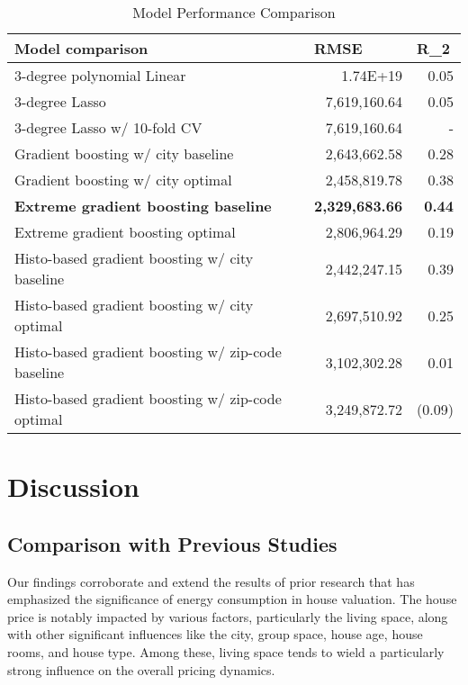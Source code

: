 \documentclass[12pt]{article} %
\begin{document}
{            \begin{table}[h]
                \begin{tabular}{lrr}
                \textbf{Model   comparison} & \multicolumn{1}{l}{\textbf{RMSE}} & \multicolumn{1}{l}{\textbf{R\_2}} \\ \hline
                3-degree polynomial Linear                           & 1.74E+19     & 0.05   \\
                3-degree Lasso                                       & 7,619,160.64 & 0.05   \\
                3-degree Lasso w/ 10-fold CV                         & 7,619,160.64 & -      \\
                Gradient boosting w/ city baseline                   & 2,643,662.58 & 0.28   \\
                Gradient boosting w/ city optimal                    & 2,458,819.78 & 0.38   \\
                \textbf{Extreme gradient boosting baseline}                   & \textbf{2,329,683.66} & \textbf{0.44}   \\
                Extreme gradient boosting optimal                    & 2,806,964.29 & 0.19   \\
                Histo-based gradient boosting w/ city   baseline     & 2,442,247.15 & 0.39   \\
                Histo-based gradient boosting w/ city   optimal      & 2,697,510.92 & 0.25   \\
                Histo-based gradient boosting w/ zip-code   baseline & 3,102,302.28 & 0.01   \\
                Histo-based gradient boosting   w/ zip-code optimal  & 3,249,872.72 & (0.09) \\ \hline
                \end{tabular}
                \caption{Model Performance Comparison}
                \label{table:Model_comparison}
                \end{table}


\section{Discussion}
    \subsection{Comparison with Previous Studies} 
    
    Our findings corroborate and extend the results of prior research that has emphasized the significance of energy consumption in house valuation. The house price is notably impacted by various factors, particularly the living space, along with other significant influences like the city, group space, house age, house rooms, and house type. Among these, living space tends to wield a particularly strong influence on the overall pricing dynamics.
    
}
\end{document}
